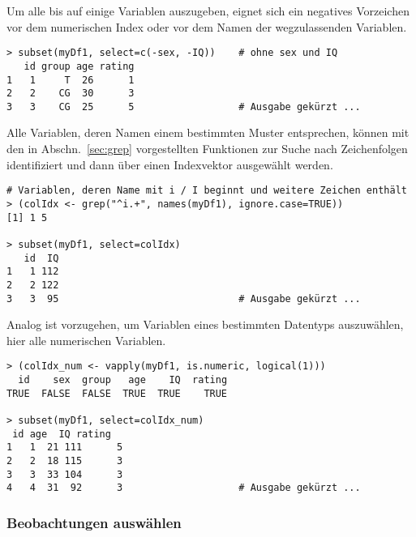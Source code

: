 Um alle bis auf einige Variablen auszugeben, eignet sich ein negatives Vorzeichen vor dem numerischen Index oder vor dem Namen der wegzulassenden Variablen.
\begin{lstlisting}
> subset(myDf1, select=c(-sex, -IQ))    # ohne sex und IQ
   id group age rating
1   1     T  26      1
2   2    CG  30      3
3   3    CG  25      5                  # Ausgabe gekürzt ...
\end{lstlisting}

Alle Variablen, deren Namen einem bestimmten Muster entsprechen, können mit den in Abschn.\ \ref{sec:grep} vorgestellten Funktionen zur Suche nach Zeichenfolgen identifiziert und dann über einen Indexvektor ausgewählt werden.
\begin{lstlisting}
# Variablen, deren Name mit i / I beginnt und weitere Zeichen enthält
> (colIdx <- grep("^i.+", names(myDf1), ignore.case=TRUE))
[1] 1 5

> subset(myDf1, select=colIdx)
   id  IQ
1   1 112
2   2 122
3   3  95                               # Ausgabe gekürzt ...
\end{lstlisting}

Analog ist vorzugehen, um Variablen eines bestimmten Datentyps auszuwählen, hier alle numerischen Variablen.
\begin{lstlisting}
> (colIdx_num <- vapply(myDf1, is.numeric, logical(1)))
  id    sex  group   age    IQ  rating
TRUE  FALSE  FALSE  TRUE  TRUE    TRUE

> subset(myDf1, select=colIdx_num)
 id age  IQ rating
1   1  21 111      5
2   2  18 115      3
3   3  33 104      3
4   4  31  92      3                    # Ausgabe gekürzt ...
\end{lstlisting}

\subsubsection{Beobachtungen auswählen}

